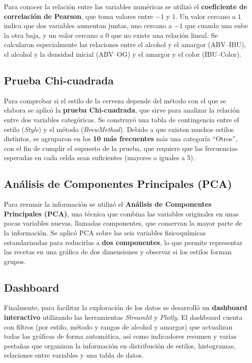 \documentclass[11pt]{article}
\begin{document}
Para conocer la relación entre las variables numéricas se utilizó el
\textbf{coeficiente de correlación de Pearson}, que toma valores entre $-1$ y $1$.
Un valor cercano a $1$ indica que dos variables aumentan juntas, uno cercano a
$-1$ que cuando una sube la otra baja, y un valor cercano a $0$ que no existe una
relación lineal. Se calcularon especialmente las relaciones entre el alcohol y el
amargor (ABV--IBU), el alcohol y la densidad inicial (ABV--OG) y el amargor y el
color (IBU--Color).

\subsection{Prueba Chi-cuadrada}

Para comprobar si el estilo de la cerveza depende del método con el que se elabora
se aplicó la \textbf{prueba Chi-cuadrada}, que sirve para analizar la relación
entre dos variables categóricas. Se construyó una tabla de contingencia entre el
estilo (\textit{Style}) y el método (\textit{BrewMethod}). Debido a que existen
muchos estilos distintos, se agruparon en los \textbf{10 más frecuentes} más una
categoría ``Otros'', con el fin de cumplir el supuesto de la prueba, que requiere
que las frecuencias esperadas en cada celda sean suficientes (mayores o iguales a
5).

\subsection{Análisis de Componentes Principales (PCA)}

Para resumir la información se utilizó el \textbf{Análisis de Componentes
Principales (PCA)}, una técnica que combina las variables originales en unas pocas
variables nuevas, llamadas componentes, que conservan la mayor parte de la
información. Se aplicó PCA sobre las seis variables fisicoquímicas estandarizadas
para reducirlas a \textbf{dos componentes}, lo que permite representar las recetas
en una gráfica de dos dimensiones y observar si los estilos forman grupos.

\subsection{Dashboard}

Finalmente, para facilitar la exploración de los datos se desarrolló un
\textbf{dashboard interactivo} utilizando las herramientas \textit{Streamlit} y
\textit{Plotly}. El dashboard cuenta con filtros (por estilo, método y rangos de
alcohol y amargor) que actualizan todas las gráficas de forma automática, así como
indicadores resumen y varias pestañas que organizan la información en distribución
de estilos, histogramas, relaciones entre variables y una tabla de datos.
\end{document}

